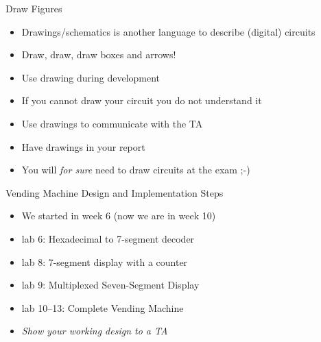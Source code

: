 \begin{frame}[fragile]{Draw Figures}
\begin{itemize}
\item Drawings/schematics is another language to describe (digital) circuits
\item Draw, draw, draw boxes and arrows!
\item Use drawing during development
\item If you cannot draw your circuit you do not understand it
\item Use drawings to communicate with the TA
\item Have drawings in your report
\item You will \emph{for sure} need to draw circuits at the exam ;-)
\end{itemize}
\end{frame}


\begin{frame}[fragile]{Vending Machine Design and Implementation Steps}
\begin{itemize}
\item We started in week 6 (now we are in week 10)
\item lab 6: Hexadecimal to 7-segment decoder
\item lab 8: 7-segment display with a counter
\item lab 9: Multiplexed Seven-Segment Display
\item lab 10--13: Complete Vending Machine
\item \emph{Show your working design to a TA}
\end{itemize}
\end{frame}

